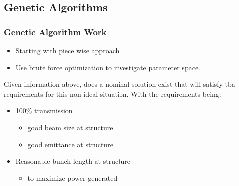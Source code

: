 \documentclass[professionalfonts,t]{beamer}
\begin{document}
\subsection{Genetic Algorithms}
\begin{frame}
\frametitle{Genetic Algorithm Work}

\begin{itemize}
	\item Starting with piece wise approach
	\item Use brute force optimization to investigate parameter space.
\end{itemize}

\vspace{0.5em}
Given information above, does a nominal solution exist that will satisfy tba requirements for this non-ideal situation. With the requirements being:
\begin{itemize}
	\item 100\% transmission 
	\begin{itemize}
		\item good beam size at structure
		\item good emittance at structure
	\end{itemize}
	\item Reasonable bunch length at structure
	\begin{itemize}
		\item to maximize power generated
	\end{itemize}
\end{itemize}
\end{frame}
\end{document}
